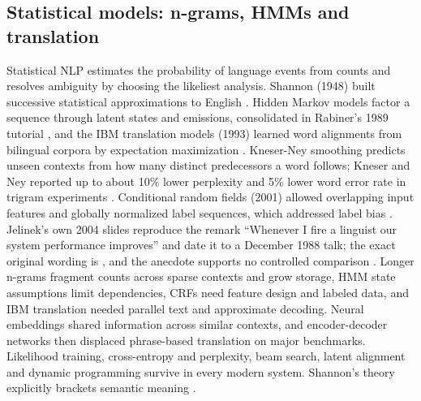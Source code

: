 \subsection{Statistical models: n-grams, HMMs and translation}
Statistical NLP estimates the probability of language events from counts and resolves ambiguity by choosing the likeliest analysis. Shannon (1948) built successive statistical approximations to English \cite{pre4}. Hidden Markov models factor a sequence through latent states and emissions, consolidated in Rabiner's 1989 tutorial \cite{pre7}, and the IBM translation models (1993) learned word alignments from bilingual corpora by expectation maximization \cite{pre6}. Kneser-Ney smoothing predicts unseen contexts from how many distinct predecessors a word follows; Kneser and Ney reported up to about 10\% lower perplexity and 5\% lower word error rate in trigram experiments \cite{pre5}. Conditional random fields (2001) allowed overlapping input features and globally normalized label sequences, which addressed label bias \cite{pre8}. Jelinek's own 2004 slides reproduce the remark ``Whenever I fire a linguist our system performance improves'' and date it to a December 1988 talk; the exact original wording is \unverified, and the anecdote supports no controlled comparison \cite{pre9}. Longer n-grams fragment counts across sparse contexts and grow storage, HMM state assumptions limit dependencies, CRFs need feature design and labeled data, and IBM translation needed parallel text and approximate decoding. Neural embeddings shared information across similar contexts, and encoder-decoder networks then displaced phrase-based translation on major benchmarks. Likelihood training, cross-entropy and perplexity, beam search, latent alignment and dynamic programming survive in every modern system. Shannon's theory explicitly brackets semantic meaning \cite{pre4}.

